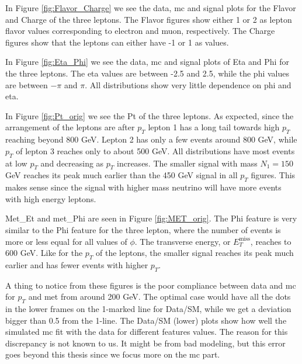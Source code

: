 \documentclass[a4paper, american, 12pt]{report}
\begin{document}
	In Figure \ref{fig:Flavor_Charge} we see the data, \acrshort{mc} and signal plots for the Flavor and Charge of the three leptons. The Flavor figures show either 1 or 2 as lepton flavor values corresponding to electron and muon, respectively. The Charge figures show that the leptons can either have -1 or 1 as values.
	
	In Figure \ref{fig:Eta_Phi} we see the data, \acrshort{mc} and signal plots of Eta and Phi for the three leptons. The eta values are between -2.5 and 2.5, while the phi values are between $-\pi$ and $\pi$. All distributions show very little dependence on phi and eta. 
	
	In Figure \ref{fig:Pt_orig} we see the Pt of the three leptons. As expected, since the arrangement of the leptons are after $p_T$ lepton 1 has a long tail towards high $p_T$ reaching beyond 800 GeV. Lepton 2 has only a few events around 800 GeV, while $p_T$ of lepton 3 reaches only to about 500 GeV. All distributions have most events at low $p_T$ and decreasing as $p_T$ increases. The smaller signal with mass $N_1=150$ GeV reaches its peak much earlier than the 450 GeV signal in all $p_T$ figures. This makes sense since the signal with higher mass neutrino will have more events with high energy leptons.
	
	Met\_Et and met\_Phi are seen in Figure \ref{fig:MET_orig}. The Phi feature is very similar to the Phi feature for the three lepton, where the number of events is more or less equal for all values of $\phi$. The transverse energy, or $E_T^{\text{miss}}$, reaches to 600 GeV. Like for the $p_T$ of the leptons, the smaller signal reaches its peak much earlier and has fewer events with higher $p_T$.
	
	A thing to notice from these figures is the poor compliance between data and \acrshort{mc} for $p_T$ and \acrshort{met} from around 200 GeV. The optimal case would have all the dots in the lower frames on the 1-marked line for Data/SM, while we get a deviation bigger than 0.5 from the 1-line. The Data/SM (lower) plots show how well the simulated \acrshort{mc} fit with the data for different features values. The reason for this discrepancy is not known to us. It might be from bad modeling, but this error goes beyond this thesis since we focus more on the \acrshort{mc} part.
	
\end{document}
